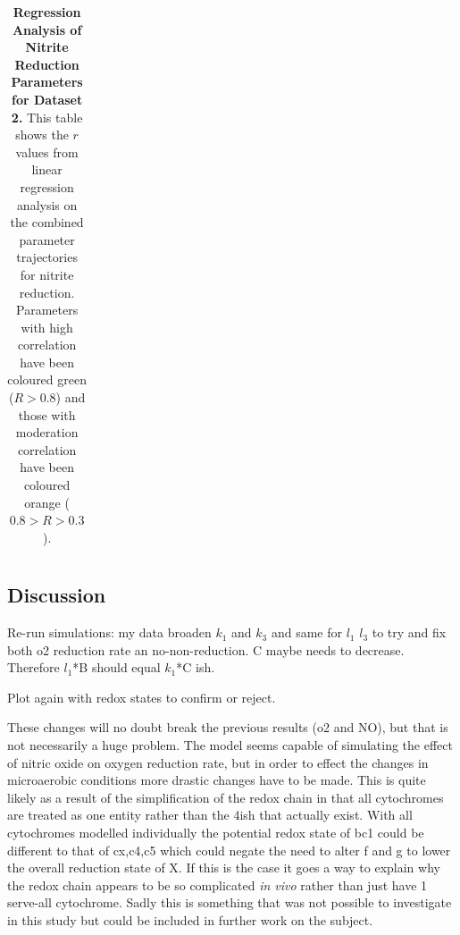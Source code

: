 \begin{table}[p]
{\begin{minipage}{24.4cm}
\begin{tabular}{|c|c|c|c|c|c|c|c|c|c|c|c|c|c|c|c|c|c|c|}
\hline
  \end{tabular}
  \caption[Regression Analysis of Nitrite Reduction Parameters]{{\bf Regression Analysis of Nitrite Reduction Parameters for Dataset 2.} This table shows the $r$ values from linear regression analysis on the combined parameter trajectories for nitrite reduction. Parameters with high correlation have been coloured green ($R>0.8$) and those with moderation correlation have been coloured orange ($0.8>R>0.3$).
  \label{tab:nitrite-regression}}
  \end{minipage}
  }
\end{table}
\afterpage{\clearpage}

\subsection{Discussion}

Re-run simulations: my data broaden $k_1$ and $k_3$ and same for $l_1$ $l_3$ to try and fix both o2 reduction rate an no-non-reduction. C maybe needs to decrease. Therefore $l_1$*B should equal $k_1$*C ish.

Plot again with redox states to confirm or reject.

These changes will no doubt break the previous results (o2 and NO), but that is not necessarily a huge problem. The model seems capable of simulating the effect of nitric oxide on oxygen reduction rate, but in order to effect the changes in microaerobic conditions more drastic changes have to be made. This is quite likely as a result of the simplification of the redox chain in that all cytochromes are treated as one entity rather than the 4ish that actually exist. With all cytochromes modelled individually the potential redox state of bc1 could be different to that of cx,c4,c5 which could negate the need to alter f and g to lower the overall reduction state of X. If this is the case it goes a way to explain why the redox chain appears to be so complicated \textit{in vivo} rather than just have 1 serve-all cytochrome. Sadly this is something that was not possible to investigate in this study but could be included in further work on the subject.
